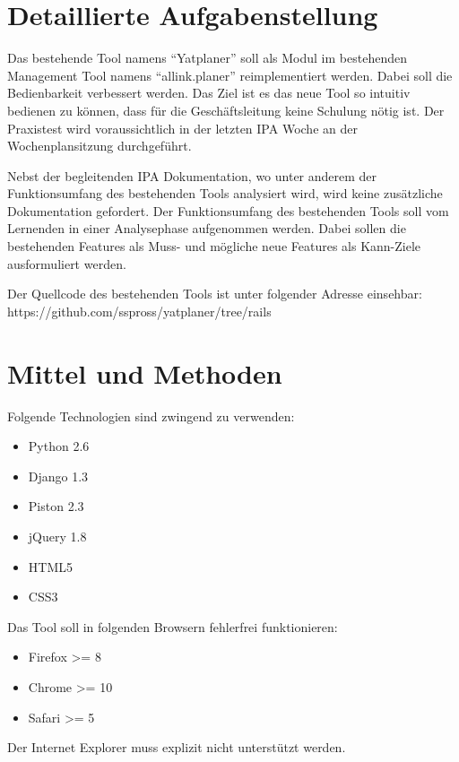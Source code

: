 \section{Detaillierte Aufgabenstellung}
    
Das bestehende Tool namens ``Yatplaner'' soll als Modul im bestehenden Management Tool namens ``allink.planer'' reimplementiert werden. Dabei soll die Bedienbarkeit verbessert werden. Das Ziel ist es das neue Tool so intuitiv bedienen zu können, dass für die Geschäftsleitung keine Schulung nötig ist. Der Praxistest wird voraussichtlich in der letzten IPA Woche an der Wochenplansitzung durchgeführt.

Nebst der begleitenden IPA Dokumentation, wo unter anderem der Funktionsumfang des bestehenden Tools analysiert wird, wird keine zusätzliche Dokumentation gefordert. Der Funktionsumfang des bestehenden Tools soll vom Lernenden in einer Analysephase aufgenommen werden. Dabei sollen die bestehenden Features als Muss- und mögliche neue Features als Kann-Ziele ausformuliert werden.

Der Quellcode des bestehenden Tools ist unter folgender Adresse einsehbar: \\https://github.com/sspross/yatplaner/tree/rails

\section{Mittel und Methoden}
Folgende Technologien sind zwingend zu verwenden:

\begin{itemize}
    \item  Python 2.6
    \item  Django 1.3
    \item  Piston 2.3
    \item  jQuery 1.8
    \item  HTML5
    \item  CSS3
\end{itemize}

Das Tool soll in folgenden Browsern fehlerfrei funktionieren:

\begin{itemize}
    \item Firefox >= 8
    \item Chrome >= 10
    \item Safari >= 5
\end{itemize}

Der Internet Explorer muss explizit nicht unterstützt werden.
    
